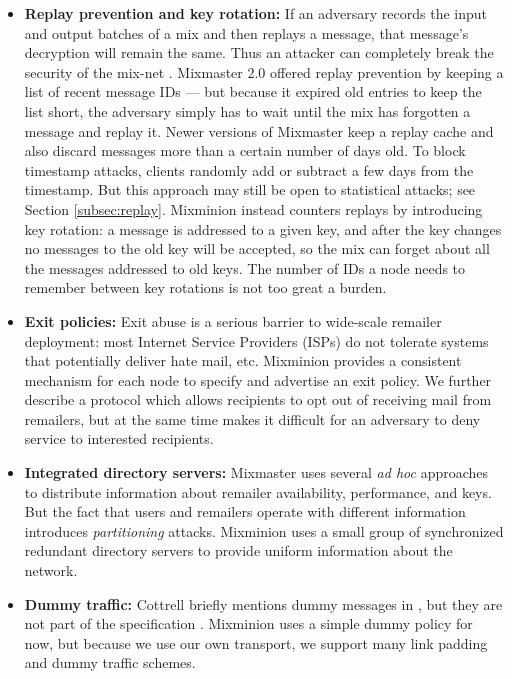 \documentclass[times,10pt,twocolumn]{article}
\begin{document}
\begin{itemize}
\item \textbf{Replay prevention and key rotation:} If an adversary records
the input and output batches of a mix and then replays a message, that
message's decryption will remain the same. Thus an attacker can completely
break the security of the mix-net \cite{chaum-mix}. Mixmaster 2.0 offered
replay prevention by keeping a list of recent message IDs --- but because
it expired old entries to keep the list short, the adversary simply
has to wait until the mix has forgotten a message and replay it. Newer
versions of Mixmaster keep a replay cache and also discard messages more
than a certain number of days old. To block timestamp attacks, clients
randomly add or subtract a few days from the timestamp. But this approach
may still be open to statistical attacks; see Section \ref{subsec:replay}.
Mixminion instead counters replays by introducing
key rotation: a message is addressed to a given key, and after the key
changes no messages to the old key will be accepted, so the mix can forget
about all the messages addressed to old keys. The
number of IDs a node needs to remember between key rotations is not
too great a burden.

\item \textbf{Exit policies:} Exit abuse is a serious barrier to wide-scale
remailer deployment: most Internet Service Providers (ISPs) do not
tolerate systems that potentially 
deliver hate mail, etc.
Mixminion provides a consistent mechanism for each node to specify and
advertise an exit policy. We
further describe a protocol which allows recipients to opt out of receiving mail
from remailers, but at the same time makes it difficult for an adversary
to deny service to interested recipients.

\item \textbf{Integrated directory servers:} Mixmaster uses several \emph{ad hoc}
approaches to distribute information about remailer availability, performance, and
keys. But the fact that users and remailers operate with
different information introduces \emph{partitioning} attacks.
Mixminion
uses a small group of synchronized redundant directory servers
to provide uniform information about the network.

\item \textbf{Dummy traffic:} Cottrell briefly mentions dummy messages
in \cite{mixmaster-attacks}, but they are not part of the specification
\cite{mixmaster-spec}. Mixminion uses a simple dummy policy for now,
but because we use our own transport, we support many
link padding and dummy traffic schemes.

\end{itemize}
\end{document}
